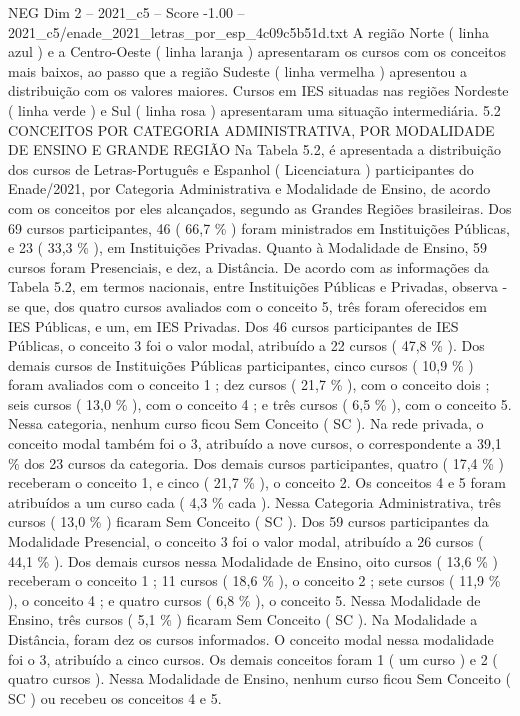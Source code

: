 \begin{textsample}{NEG Dim 2 – 2021\_c5 – Score -1.00 – 2021\_c5/enade\_2021\_letras\_por\_esp\_4c09c5b51d.txt}
A região Norte ( linha azul ) e a Centro-Oeste ( linha laranja ) apresentaram os cursos com os conceitos mais baixos, ao passo que a região Sudeste ( linha vermelha ) apresentou a distribuição com os valores maiores.
Cursos em IES situadas nas regiões Nordeste ( linha verde ) e Sul ( linha rosa ) apresentaram uma situação intermediária. 5.2 CONCEITOS POR CATEGORIA ADMINISTRATIVA, POR MODALIDADE DE ENSINO E GRANDE REGIÃO Na Tabela 5.2, é apresentada a distribuição dos cursos de Letras-Português e Espanhol ( Licenciatura ) participantes do Enade/2021, por Categoria Administrativa e Modalidade de Ensino, de acordo com os conceitos por eles alcançados, segundo as Grandes Regiões brasileiras.
Dos 69 cursos participantes, 46 ( 66,7 \% ) foram ministrados em Instituições Públicas, e 23 ( 33,3 \% ), em Instituições Privadas.
Quanto à Modalidade de Ensino, 59 cursos foram Presenciais, e dez, a Distância.
De acordo com as informações da Tabela 5.2, em termos nacionais, entre Instituições Públicas e Privadas, observa -se que, dos quatro cursos avaliados com o conceito 5, três foram oferecidos em IES Públicas, e um, em IES Privadas.
Dos 46 cursos participantes de IES Públicas, o conceito 3 foi o valor modal, atribuído a 22 cursos ( 47,8 \% ).
Dos demais cursos de Instituições Públicas participantes, cinco cursos ( 10,9 \% ) foram avaliados com o conceito 1 ; dez cursos ( 21,7 \% ), com o conceito dois ; seis cursos ( 13,0 \% ), com o conceito 4 ; e três cursos ( 6,5 \% ), com o conceito 5.
Nessa categoria, nenhum curso ficou Sem Conceito ( SC ).
Na rede privada, o conceito modal também foi o 3, atribuído a nove cursos, o correspondente a 39,1 \% dos 23 cursos da categoria.
Dos demais cursos participantes, quatro ( 17,4 \% ) receberam o conceito 1, e cinco ( 21,7 \% ), o conceito 2.
Os conceitos 4 e 5 foram atribuídos a um curso cada ( 4,3 \% cada ).
Nessa Categoria Administrativa, três cursos ( 13,0 \% ) ficaram Sem Conceito ( SC ).
Dos 59 cursos participantes da Modalidade Presencial, o conceito 3 foi o valor modal, atribuído a 26 cursos ( 44,1 \% ).
Dos demais cursos nessa Modalidade de Ensino, oito cursos ( 13,6 \% ) receberam o conceito 1 ; 11 cursos ( 18,6 \% ), o conceito 2 ; sete cursos ( 11,9 \% ), o conceito 4 ; e quatro cursos ( 6,8 \% ), o conceito 5.
Nessa Modalidade de Ensino, três cursos ( 5,1 \% ) ficaram Sem Conceito ( SC ).
Na Modalidade a Distância, foram dez os cursos informados.
O conceito modal nessa modalidade foi o 3, atribuído a cinco cursos.
Os demais conceitos foram 1 ( um curso ) e 2 ( quatro cursos ).
Nessa Modalidade de Ensino, nenhum curso ficou Sem Conceito ( SC ) ou recebeu os conceitos 4 e 5.

\end{textsample}
